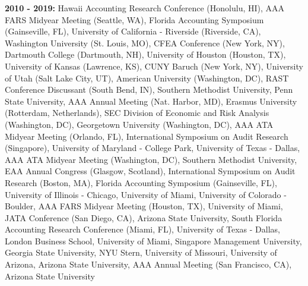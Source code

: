 \documentclass[11pt]{article}%
\begin{document}
\textbf{2010 - 2019:}  Hawaii Accounting Research Conference (Honolulu, HI), AAA FARS Midyear Meeting (Seattle, WA), Florida Accounting Symposium (Gainseville, FL), University of California - Riverside (Riverside, CA), Washington University (St. Louis, MO), CFEA Conference (New York, NY), Dartmouth College (Dartmouth, NH), University of Houston (Houston, TX), University of Kansas (Lawrence, KS), CUNY Baruch (New York, NY), University of Utah (Salt Lake City, UT), American University (Washington, DC), RAST Conference Discussant (South Bend, IN), Southern Methodist University, Penn State University, AAA Annual Meeting (Nat. Harbor, MD), Erasmus University (Rotterdam, Netherlands), SEC Division of Economic and Risk Analysis (Washington, DC), Georgetown University (Washington, DC), AAA ATA Midyear Meeting (Orlando, FL),  International Symposium on Audit Research (Singapore), University of Maryland - College Park, University of Texas - Dallas, AAA ATA Midyear Meeting (Washington, DC),  Southern Methodist University, EAA Annual Congress (Glasgow, Scotland), International Symposium on Audit Research (Boston, MA), Florida Accounting Symposium (Gainseville, FL), University of Illinois - Chicago, University of Miami, University of Colorado - Boulder, AAA FARS Midyear Meeting (Houston, TX), University of Miami, JATA Conference (San Diego, CA), Arizona State University, South Florida Accounting Research Conference (Miami, FL), University of Texas - Dallas, London Business School, University of Miami, Singapore Management University, Georgia State University, NYU Stern, University of
Missouri, University of Arizona, Arizona State University, AAA Annual Meeting (San Francisco, CA), Arizona State University
\end{document}
